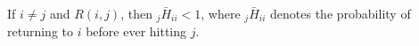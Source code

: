 If $i \neq j$ and $R(i,j)$, then ${}_j\bar{H}_{ii} < 1$, where ${}_j\bar{H}_{ii}$ denotes the probability of returning to $i$ before ever hitting $j$.
